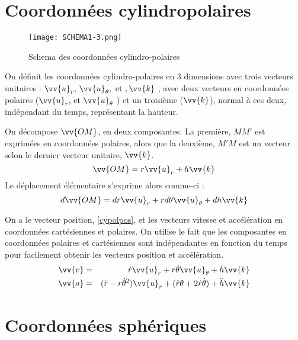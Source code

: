 \section{Coordonnées cylindropolaires}

\begin{figure}[!htb]
    \centering
    \texttt{[image: SCHEMA1-3.png]}
    \caption{Schema des coordonnées cylindro-polaires}
    \label{fig:SCHEMA-COCY}
\end{figure}
\newpage
\begin{definition}
    On définit les coordonnées cylindro-polaires en 3 dimensions avec trois vecteurs unitaires : \(\vv{u}_{r}, \, \vv{u}_{\theta}, \text{ et }, \vv{k}\) , avec deux vecteurs en coordonnées polaires (\(\vv{u}_{r}\text{, et } \vv{u}_{\theta}\) ) et un troisième (\(\vv{k}\)), normal à ces deux, indépendant du temps, représentant la hauteur.
\end{definition}

\begin{corollary}\label{cypolpos}
    On décompose \(\vv{OM}\), en deux composantes. La première, \(MM'\) est exprimées en coordonnées polaires, alors que la deuxième, \(M'M\) est un vecteur selon le dernier vecteur unitaire, \(\vv{k}\). 
    \[
        \vv{OM} = r\vv{u}_{r} + h\vv{k}
    \] 
    Le déplacement élémentaire s'exprime alors comme-ci : 
    \[
        d \vv{OM} = dr\vv{u}_{r} + rd \theta \vv{u}_{\theta} + dh\vv{k}
    \]
\end{corollary}

\begin{corollary}\label{cycolva}
    On a le vecteur position, \autoref{cypolpos}, et les vecteurs vitesse et accélération en coordonnées cartésiennes et polaires. On utilise le fait que les composantes en coordonnées polaires et cartésiennes sont indépendantes en fonction du temps pour facilement obtenir les vecteurs position et accélération.
    \begin{eqnarray*}
        \vv{v} &=& \dot{r}\vv{u}_{r} + r \dot{\theta}\vv{u}_{\theta} + \dot{h}\vv{k}\\
        \vv{a} &=& (\ddot{r} -r \dot{\theta}^{2})\vv{u}_{r} + (\ddot{r}\theta + 2\dot{r}\dot{\theta}) + \ddot{h}\vv{k}
    \end{eqnarray*}
\end{corollary}

\section{Coordonnées sphériques}

